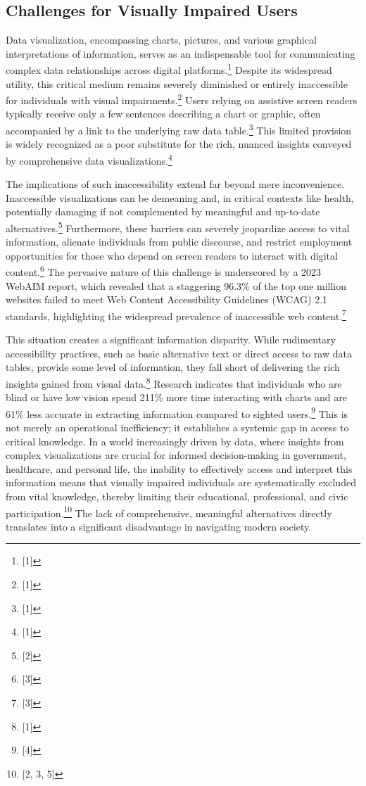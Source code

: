 \subsection{Challenges for Visually Impaired Users}
Data visualization, encompassing charts, pictures, and various graphical interpretations of information, serves as an indispensable tool for communicating complex data relationships across digital platforms.\footnote{[1]} Despite its widespread utility, this critical medium remains severely diminished or entirely inaccessible for individuals with visual impairments.\footnote{[1]} Users relying on assistive screen readers typically receive only a few sentences describing a chart or graphic, often accompanied by a link to the underlying raw data table.\footnote{[1]} This limited provision is widely recognized as a poor substitute for the rich, nuanced insights conveyed by comprehensive data visualizations.\footnote{[1]}

The implications of such inaccessibility extend far beyond mere inconvenience. Inaccessible visualizations can be demeaning and, in critical contexts like health, potentially damaging if not complemented by meaningful and up-to-date alternatives.\footnote{[2]} Furthermore, these barriers can severely jeopardize access to vital information, alienate individuals from public discourse, and restrict employment opportunities for those who depend on screen readers to interact with digital content.\footnote{[3]} The pervasive nature of this challenge is underscored by a 2023 WebAIM report, which revealed that a staggering 96.3\% of the top one million websites failed to meet Web Content Accessibility Guidelines (WCAG) 2.1 standards, highlighting the widespread prevalence of inaccessible web content.\footnote{[3]}

This situation creates a significant information disparity. While rudimentary accessibility practices, such as basic alternative text or direct access to raw data tables, provide some level of information, they fall short of delivering the rich insights gained from visual data.\footnote{[1]} Research indicates that individuals who are blind or have low vision spend 211\% more time interacting with charts and are 61\% less accurate in extracting information compared to sighted users.\footnote{[4]} This is not merely an operational inefficiency; it establishes a systemic gap in access to critical knowledge. In a world increasingly driven by data, where insights from complex visualizations are crucial for informed decision-making in government, healthcare, and personal life, the inability to effectively access and interpret this information means that visually impaired individuals are systematically excluded from vital knowledge, thereby limiting their educational, professional, and civic participation.\footnote{[2, 3, 5]} The lack of comprehensive, meaningful alternatives directly translates into a significant disadvantage in navigating modern society.

